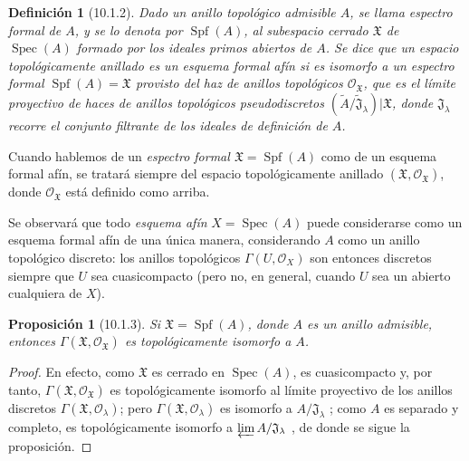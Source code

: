 \documentclass[oneside]{amsart}
\theoremstyle{ega-env-style}
\theoremstyle{ega-thm-env-style}
\newtheorem*{proposition}{Proposición}
\theoremstyle{ega-defn-env-style}
\newtheorem*{definition}{Definición}
\let\EGAOriginalLabel\label
\renewcommand{\label}[1]{\phantomsection\EGAOriginalLabel{#1}}
\begin{document}
\begin{definition}[10.1.2]
\label{I.10.1.2}
Dado un anillo topológico \emph{admisible} $A$, se llama espectro formal de $A$, y se lo denota por $\operatorname{Spf}(A)$, al subespacio cerrado $\mathfrak{X}$ de $\operatorname{Spec}(A)$ formado por los ideales primos \emph{abiertos} de $A$.
Se dice que un espacio topológicamente anillado es un \emph{esquema formal afín} si es isomorfo a un espectro formal $\operatorname{Spf}(A)=\mathfrak{X}$ provisto del haz de anillos topológicos $\mathscr{O}_{\mathfrak{X}}$, que es el límite proyectivo de haces de anillos topológicos pseudodiscretos $(\widetilde{A}/\widetilde{\mathfrak{J}}_\lambda)|\mathfrak{X}$, donde $\mathfrak{J}_\lambda$ recorre el conjunto filtrante de los ideales de definición de $A$.
\end{definition}

Cuando hablemos de un \emph{espectro formal $\mathfrak{X}=\operatorname{Spf}(A)$} como de un esquema formal afín, se tratará siempre del espacio topológicamente anillado $(\mathfrak{X},\mathscr{O}_{\mathfrak{X}})$, donde $\mathscr{O}_{\mathfrak{X}}$ está definido como arriba.

Se observará que todo \emph{esquema afín} $X=\operatorname{Spec}(A)$ puede considerarse como un esquema formal afín de una única manera, considerando $A$ como un anillo topológico discreto: los anillos topológicos $\Gamma(U,\mathscr{O}_X)$ son entonces discretos siempre que $U$ sea cuasicompacto (pero no, en general, cuando $U$ sea un abierto cualquiera de $X$).

\begin{proposition}[10.1.3]
\label{I.10.1.3}
Si $\mathfrak{X}=\operatorname{Spf}(A)$, donde $A$ es un anillo admisible, entonces $\Gamma(\mathfrak{X},\mathscr{O}_{\mathfrak{X}})$ es topológicamente isomorfo a $A$.
\end{proposition}

\begin{proof}
En efecto, como $\mathfrak{X}$ es cerrado en $\operatorname{Spec}(A)$, es cuasicompacto y, por tanto, $\Gamma(\mathfrak{X},\mathscr{O}_{\mathfrak{X}})$ es topológicamente isomorfo al límite proyectivo de los anillos discretos $\Gamma(\mathfrak{X},\mathscr{O}_\lambda)$; pero $\Gamma(\mathfrak{X},\mathscr{O}_\lambda)$ es isomorfo a $A/\mathfrak{J}_\lambda$ ; como $A$ es separado y completo, es topológicamente isomorfo a $\varprojlim A/\mathfrak{J}_\lambda$ , de donde se sigue la proposición.
\end{proof}
\end{document}
